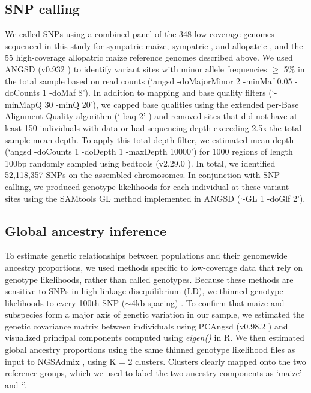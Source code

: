 \subsection*{SNP calling}
We called SNPs using a combined panel of the 348 low-coverage genomes sequenced in this study for sympatric maize, sympatric \mexicana, and allopatric \mexicana, and the 55 high-coverage allopatric maize reference genomes described above. We used ANGSD (v0.932 \cite{Korneliussen:2014_ANGSD}) to identify variant sites with minor allele frequencies $\geq$ 5\% in the total sample based on read counts (‘angsd -doMajorMinor 2 -minMaf 0.05 -doCounts 1 -doMaf 8'). In addition to mapping and base quality filters (‘-minMapQ 30 -minQ 20'), we capped base qualities using the extended per-Base Alignment Quality algorithm (‘-baq 2' \cite{Li:2011_BAQ}) and removed sites that did not have at least 150 individuals with data or had sequencing depth exceeding 2.5x the total sample mean depth. To apply this total depth filter, we estimated mean depth (‘angsd -doCounts 1 -doDepth 1 -maxDepth 10000') for 1000 regions of length 100bp randomly sampled using bedtools (v2.29.0 \cite{Quinlan:2010_bedtools}). 
In total, we identified 52,118,357 SNPs on the assembled chromosomes. In conjunction with SNP calling, we produced genotype likelihoods for each individual at these variant sites using the SAMtools GL method \cite{Li:2009samtools} implemented in ANGSD (‘-GL 1 -doGlf 2').

\subsection*{Global ancestry inference}
To estimate genetic relationships between populations and their genomewide ancestry proportions, we used methods specific to low-coverage data that rely on genotype likelihoods, rather than called genotypes. 
Because these methods are sensitive to SNPs in high linkage disequilibrium (LD), we thinned genotype likelihoods to every 100th SNP ($\sim$4kb spacing) \cite{Tenaillon:2001_LD}.
To confirm that maize and \mexicana subspecies form a major axis of genetic variation in our sample, we estimated the genetic covariance matrix between individuals using PCAngsd (v0.98.2 \cite{Meisner:2018_pcangsd}) and visualized principal components computed using \textit{eigen()} in R. 
We then estimated global ancestry proportions using the same thinned genotype likelihood files as input to NGSAdmix \cite{Skotte:2013_NGSadmix},  using K = 2 clusters. 
Clusters clearly mapped onto the two reference groups, which we used to label the two ancestry components as ‘maize' and ‘\mexicana'.

